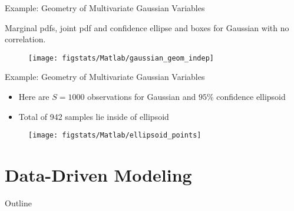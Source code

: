 \documentclass[9pt]{beamer}
\begin{document}
%
\begin{frame}{Example: Geometry of Multivariate Gaussian Variables}

Marginal pdfs, joint pdf and confidence ellipse and boxes for Gaussian with no correlation. 
\begin{figure}[!htb]
    \centering
	\texttt{[image: figstats/Matlab/gaussian\_geom\_indep]}
\end{figure}

\end{frame}

%
\begin{frame}{Example: Geometry of Multivariate Gaussian Variables}

\begin{itemize}
\item Here are $S=1000$ observations for Gaussian and $95\%$ confidence ellipsoid
\item Total of 942 samples lie inside of ellipsoid 
\end{itemize}
\begin{figure}[!htb]
    \centering
	\texttt{[image: figstats/Matlab/ellipsoid\_points]}
\end{figure}

\end{frame}

\section{Data-Driven Modeling}
\begin{frame}{Outline}
\tableofcontents[currentsection]
\end{frame}
\end{document}
